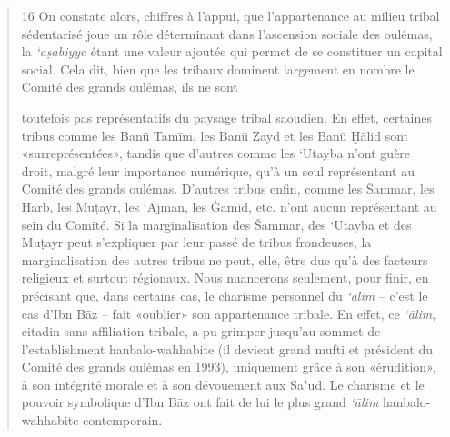\begin{quote}
16 On constate alors, chiffres à l'appui, que l'appartenance au milieu
tribal sédentarisé joue un rôle déterminant dans l'ascension sociale des
oulémas, la \emph{`aṣabiyya} étant une valeur ajoutée qui permet de se
constituer un capital social. Cela dit, bien que les tribaux dominent
largement en nombre le Comité des grands oulémas, ils ne sont

toutefois pas représentatifs du paysage tribal saoudien. En effet,
certaines tribus comme les Banū Tamīm, les Banū Zayd et les Banū Ḫālid
sont «surreprésentées», tandis que d'autres comme les `Utayba n'ont
guère droit, malgré leur importance numérique, qu'à un seul représentant
au Comité des grands oulémas. D'autres tribus enfin, comme les Šammar,
les Ḥarb, les Muṭayr, les `Ajmān, les Ġāmid, etc. n'ont aucun
représentant au sein du Comité. Si la marginalisation des Šammar, des
`Utayba et des Muṭayr peut s'expliquer par leur passé de tribus
frondeuses, la marginalisation des autres tribus ne peut, elle, être due
qu'à des facteurs religieux et surtout régionaux. Nous nuancerons
seulement, pour finir, en précisant que, dans certains cas, le charisme
personnel du \emph{`ālim} -- c'est le cas d'Ibn Bāz -- fait «oublier»
son appartenance tribale. En effet, ce \emph{`ālim}, citadin sans
affiliation tribale, a pu grimper jusqu'au sommet de l'establishment
hanbalo-wahhabite (il devient grand mufti et président du Comité des
grands oulémas en 1993), uniquement grâce à son «érudition», à son
intégrité morale et à son dévouement aux Sa‛ūd. Le charisme et le
pouvoir symbolique d'Ibn Bāz ont fait de lui le plus grand \emph{`ālim}
hanbalo-wahhabite contemporain.


\end{quote}
